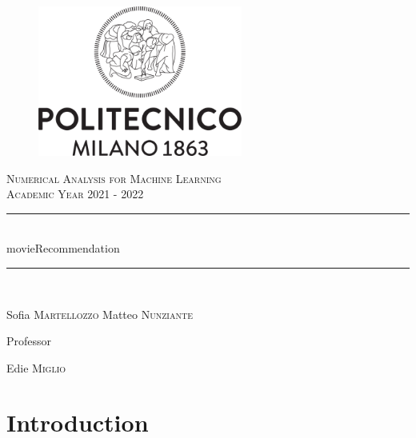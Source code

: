 \documentclass{article}
\begin{document}
\begin{titlepage}
      \centering
      \begin{figure}
            \begin{center}
                  \includegraphics[width=0.6\textwidth]{images/logo_polimi.png}
            \end{center}
      \end{figure}
      \vfill
      {\scshape\LARGE Numerical Analysis for Machine Learning\\Academic Year 2021 - 2022 \par}
      
      
      \vfill
      \newcommand{\HRule}{\rule{\linewidth}{0.3mm}}
      \centering
      \HRule \\[0.4cm]
      \huge  movieRecommendation\\%
      \HRule \\
      \vspace{1cm}
      {\Large Sofia \textsc{Martellozzo} \quad Matteo \textsc{Nunziante} \par}
      \vfill
      {\large Professor\par
          Edie \textsc{Miglio}}
\end{titlepage}


\newpage
\renewcommand\contentsname{Contents}
\tableofcontents

\newpage

\section{Introduction}
\end{document}
